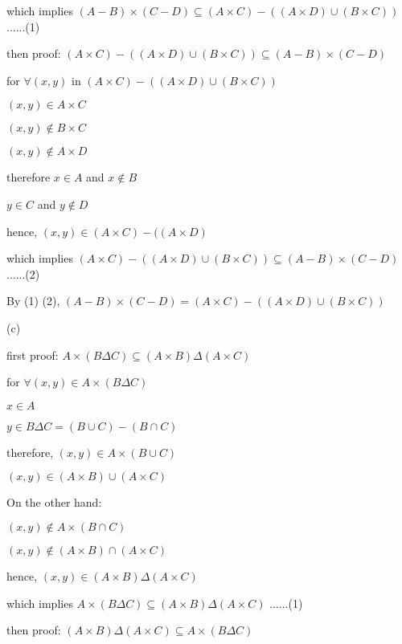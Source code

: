 \documentclass[11pt,twoside]{article}
\begin{document}
which implies $(A-B) \times (C-D)\subseteq (A \times C) - ((A \times D) \cup (B \times C))$......(1)

\hspace*{\fill}

then proof:
$ (A \times C) - ((A \times D) \cup (B \times C))\subseteq (A-B) \times (C-D)$

for $\forall (x,y)$ in $(A \times C) - ((A \times D) \cup (B \times C)) $ 

$(x,y) \in A \times C$

$(x,y) \notin B \times C$

$(x,y) \notin A \times D$

therefore $x\in A$ and $x \notin B$

$y\in C$ and $ y \notin D$

hence, $(x,y) \in (A \times C) - ((A \times D)$

which implies $ (A \times C) - ((A \times D) \cup (B \times C))\subseteq (A-B) \times (C-D)$......(2)

By (1) (2), $(A-B) \times (C-D) = (A \times C) - ((A \times D) \cup (B \times C))$

\hspace*{\fill}

(c)%

first proof:
$A \times (B \Delta C) \subseteq (A \times B) \Delta (A \times C)$

for $\forall (x, y) \in A \times (B \Delta C)$

$x\in A$

$y\in B \Delta C = (B \cup C) - (B \cap C)$

therefore, $(x,y) \in A \times (B \cup C)$

$(x,y) \in (A \times B)\cup (A \times C)$

On the other hand:

$(x,y) \notin A \times (B \cap C)$

$(x,y) \notin (A \times B)\cap (A \times C)$


hence, $(x,y) \in (A \times B) \Delta (A \times C)$


which implies $A \times (B \Delta C) \subseteq (A \times B) \Delta (A \times C)$
......(1)

\hspace*{\fill}

then proof:
$(A \times B) \Delta (A \times C)\subseteq A \times (B \Delta C) $
\end{document}
